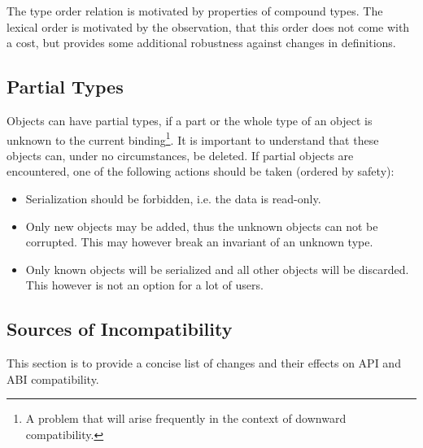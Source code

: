 \documentclass[a4paper,10pt]{article}
\begin{document}
The type order relation is motivated by properties of compound types. The lexical order is motivated by the observation, that this order does not come with a cost, but provides some additional robustness against changes in definitions.


\subsection{Partial Types}

Objects can have partial types, if a part or the whole type of an object is unknown to the current binding\footnote{A problem that will arise frequently in the context of downward compatibility.}. It is important to understand that these objects can, under no circumstances, be deleted. If partial objects are encountered, one of the following actions should be taken (ordered by safety):
\begin{itemize}
 \item Serialization should be forbidden, i.e. the data is read-only.
 \item Only new objects may be added, thus the unknown objects can not be corrupted. This may however break an invariant of an unknown type.
 \item Only known objects will be serialized and all other objects will be discarded. This however is not an option for a lot of users.
\end{itemize}


\subsection{Sources of Incompatibility}

This section is to provide a concise list of changes and their effects on API and ABI compatibility.
\end{document}
